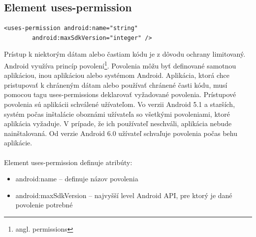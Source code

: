 \subsection{Element uses-permission}
\label{el_uses-permission}
\lstset{language=XML}
\begin{lstlisting}
<uses-permission android:name="string"
        android:maxSdkVersion="integer" />
\end{lstlisting}
Prístup k niektorým dátam alebo častiam kódu je z dôvodu ochrany limitovaný. Android využíva princíp povolení\footnote{angl. permissions}. Povolenia môžu byť definované samotnou aplikáciou, inou aplikáciou alebo systémom Android. Aplikácia, ktorá chce pristupovať k chráneným dátam alebo používať chránené časti kódu, musí pomocou tagu uses-permissions deklarovať vyžadované povolenia. Prístupové povolenia sú aplikácii schválené užívateľom. Vo verzii Android 5.1 a starších, systém počas inštalácie oboznámi užívateľa so všetkými povoleniami, ktoré aplikácia vyžaduje. V prípade, že ich používateľ neschváli, aplikácia nebude nainštalovaná. Od verzie Android 6.0 užívateľ schvaľuje povolenia počas behu aplikácie.\\\\ 
Element uses-permission definuje atribúty:\\
\begin{itemize}
\item android:name – definuje názov povolenia
\item android:maxSdkVersion – najvyšší level Android API, pre ktorý je dané povolenie potrebné
\end{itemize}

